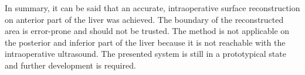 

In summary, it can be said that an accurate, intraoperative surface reconstruction on anterior
part of the liver was achieved. The boundary of the reconstructed area is
error-prone and should not be trusted. The method is not applicable on the posterior
and inferior part of the liver because it is not reachable with the
intraoperative ultrasound. The presented system is still in a prototypical state
and further development is required.


\endinput
